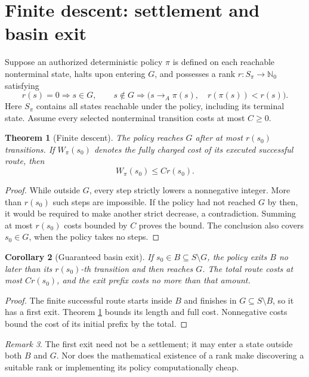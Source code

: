\documentclass[11pt,letterpaper]{article}
\newtheorem{theorem}{Theorem}[section]
\newtheorem{corollary}[theorem]{Corollary}
\theoremstyle{definition}\newtheorem{definition}[theorem]{Definition}\newtheorem{example}[theorem]{Example}
\theoremstyle{remark}\newtheorem{remark}[theorem]{Remark}
\newcommand{\NN}{\mathbb N_0}
\newcommand{\arr}{\longrightarrow_A}
\begin{document}
\section{Finite descent: settlement and basin exit}
Suppose an authorized deterministic policy $\pi$ is defined on each reachable nonterminal state, halts upon entering $G$, and possesses a rank $r:S_\pi\to\NN$ satisfying
\begin{equation}\label{eq:rank}
 r(s)=0\Longrightarrow s\in G,\qquad
 s\notin G\Longrightarrow
 \bigl(s\arr\pi(s),\quad r(\pi(s))<r(s)\bigr).
\end{equation}
Here $S_\pi$ contains all states reachable under the policy, including its terminal state. Assume every selected nonterminal transition costs at most $C\ge0$.

\begin{theorem}[Finite descent]\label{thm:descent}
The policy reaches $G$ after at most $r(s_0)$ transitions. If $W_\pi(s_0)$ denotes the fully charged cost of its executed successful route, then
\[
 W_\pi(s_0)\le Cr(s_0).
\]
\end{theorem}
\begin{proof}
While outside $G$, every step strictly lowers a nonnegative integer. More than $r(s_0)$ such steps are impossible. If the policy had not reached $G$ by then, it would be required to make another strict decrease, a contradiction. Summing at most $r(s_0)$ costs bounded by $C$ proves the bound. The conclusion also covers $s_0\in G$, when the policy takes no steps.
\end{proof}
\begin{corollary}[Guaranteed basin exit]\label{cor:exit}
If $s_0\in B\subseteq S\setminus G$, the policy exits $B$ no later than its $r(s_0)$-th transition and then reaches $G$. The total route costs at most $Cr(s_0)$, and the exit prefix costs no more than that amount.
\end{corollary}
\begin{proof}
The finite successful route starts inside $B$ and finishes in $G\subseteq S\setminus B$, so it has a first exit. Theorem \ref{thm:descent} bounds its length and full cost. Nonnegative costs bound the cost of its initial prefix by the total.
\end{proof}
\begin{remark}
The first exit need not be a settlement; it may enter a state outside both $B$ and $G$. Nor does the mathematical existence of a rank make discovering a suitable rank or implementing its policy computationally cheap.
\end{remark}
\end{document}
